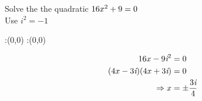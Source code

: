 



\question Solve the the quadratic $ 16 x^{2} + 9 = 0 $  \\
 Use $ {i}^{2} = -1 $   


\watchout

\ifprintanswers
  \begin{marginfigure}
      :(0,0)
      :(0,0)
    \figdrawbegin{}
      \figdrawline [100,101]
    \figdrawend
    \figvisu{\figBoxA}{}{%
    }
    \centerline{\box\figBoxA}
  \end{marginfigure}
\fi 

\begin{solution}
\begin{align}
16 x - 9 \textit{i}^{2} &= 0 \\
(4 x  - 3 \textit{i})(4 x  + 3 \textit{i}) &= 0 \\
\Rightarrow x &= \pm \dfrac{3 \textit{i}}{4} 
\end{align}
\end{solution}


